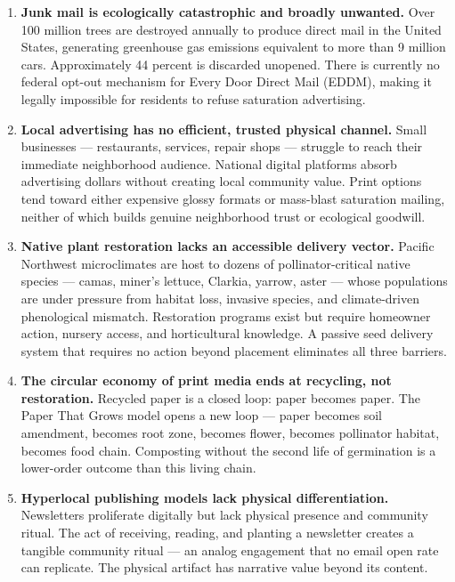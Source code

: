 \documentclass[11pt,letterpaper]{article}
\begin{document}
\begin{enumerate}
  \item \textbf{Junk mail is ecologically catastrophic and broadly unwanted.} Over 100 million trees are destroyed annually to produce direct mail in the United States, generating greenhouse gas emissions equivalent to more than 9 million cars. Approximately 44 percent is discarded unopened. There is currently no federal opt-out mechanism for Every Door Direct Mail (EDDM), making it legally impossible for residents to refuse saturation advertising.

  \item \textbf{Local advertising has no efficient, trusted physical channel.} Small businesses --- restaurants, services, repair shops --- struggle to reach their immediate neighborhood audience. National digital platforms absorb advertising dollars without creating local community value. Print options tend toward either expensive glossy formats or mass-blast saturation mailing, neither of which builds genuine neighborhood trust or ecological goodwill.

  \item \textbf{Native plant restoration lacks an accessible delivery vector.} Pacific Northwest microclimates are host to dozens of pollinator-critical native species --- camas, miner's lettuce, Clarkia, yarrow, aster --- whose populations are under pressure from habitat loss, invasive species, and climate-driven phenological mismatch. Restoration programs exist but require homeowner action, nursery access, and horticultural knowledge. A passive seed delivery system that requires no action beyond placement eliminates all three barriers.

  \item \textbf{The circular economy of print media ends at recycling, not restoration.} Recycled paper is a closed loop: paper becomes paper. The Paper That Grows model opens a new loop --- paper becomes soil amendment, becomes root zone, becomes flower, becomes pollinator habitat, becomes food chain. Composting without the second life of germination is a lower-order outcome than this living chain.

  \item \textbf{Hyperlocal publishing models lack physical differentiation.} Newsletters proliferate digitally but lack physical presence and community ritual. The act of receiving, reading, and planting a newsletter creates a tangible community ritual --- an analog engagement that no email open rate can replicate. The physical artifact has narrative value beyond its content.
\end{enumerate}
\end{document}
